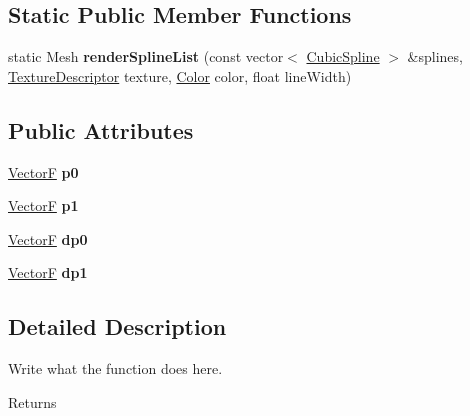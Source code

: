 \subsection*{Static Public Member Functions}
\begin{DoxyCompactItemize}
\item 
\hypertarget{structCubicSpline_ab4f44a0380e5834289a60957baeaf822}{static Mesh {\bfseries render\+Spline\+List} (const vector$<$ \hyperlink{structCubicSpline}{Cubic\+Spline} $>$ \&splines, \hyperlink{structTextureDescriptor}{Texture\+Descriptor} texture, \hyperlink{structColor}{Color} color, float line\+Width)}\label{structCubicSpline_ab4f44a0380e5834289a60957baeaf822}

\end{DoxyCompactItemize}
\subsection*{Public Attributes}
\begin{DoxyCompactItemize}
\item 
\hypertarget{structCubicSpline_a84b61c539162fcfa38762e67261e3db6}{\hyperlink{structVectorF}{Vector\+F} {\bfseries p0}}\label{structCubicSpline_a84b61c539162fcfa38762e67261e3db6}

\item 
\hypertarget{structCubicSpline_a1bee668bf0240d7b70fc7f93638d253a}{\hyperlink{structVectorF}{Vector\+F} {\bfseries p1}}\label{structCubicSpline_a1bee668bf0240d7b70fc7f93638d253a}

\item 
\hypertarget{structCubicSpline_a5ebae554d5f1da3baa730d698d1667ff}{\hyperlink{structVectorF}{Vector\+F} {\bfseries dp0}}\label{structCubicSpline_a5ebae554d5f1da3baa730d698d1667ff}

\item 
\hypertarget{structCubicSpline_aeefcf5d9423158b97037640c26cf24f0}{\hyperlink{structVectorF}{Vector\+F} {\bfseries dp1}}\label{structCubicSpline_aeefcf5d9423158b97037640c26cf24f0}

\end{DoxyCompactItemize}


\subsection{Detailed Description}
Write what the function does here. 

\begin{DoxyReturn}{Returns}

\end{DoxyReturn}


